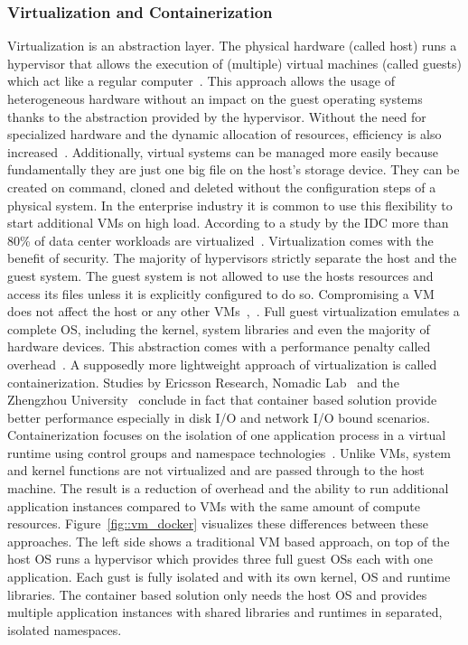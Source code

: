 \documentclass[12pt, a4paper]{article}
\begin{document}
        \subsubsection{Virtualization and Containerization}
        Virtualization is an abstraction layer. The physical hardware (called host) runs a hypervisor that allows the execution of (multiple) virtual machines (called guests) which act like a regular computer~\cite{vmbasics}. This approach allows the usage of heterogeneous hardware without an impact on the guest operating systems thanks to the abstraction provided by the hypervisor. Without the need for specialized hardware and the dynamic allocation of resources, efficiency is also increased~\cite{redhat_venv}. Additionally, virtual systems can be managed more easily because fundamentally they are just one big file on the host's storage device. They can be created on command, cloned and deleted without the configuration steps of a physical system. In the enterprise industry it is common to use this flexibility to start additional \ac{VM}s on high load. According to a study by the \ac{IDC} more than 80\% of data center workloads are virtualized~\cite{virtualaddoption}. Virtualization comes with the benefit of security. The majority of hypervisors strictly separate the host and the guest system. The guest system is not allowed to use the hosts resources and access its files unless it is explicitly configured to do so. Compromising a \ac{VM} does not affect the host or any other \ac{VM}s~\cite{vmbasics},~\cite{redhat_venv}.\newline
        Full guest virtualization emulates a complete \ac{OS}, including the kernel, system libraries and even the majority of hardware devices. This abstraction comes with a performance penalty called overhead~\cite{vmbasics}. A supposedly more lightweight approach of virtualization is called containerization. Studies by Ericsson Research, Nomadic Lab~\cite{ieee_perfomance} and the Zhengzhou University~\cite{zhengzhou_university} conclude in fact that container based solution provide better performance especially in disk \acs{I/O} and network \acs{I/O} bound scenarios. Containerization focuses on the isolation of one application process in a virtual runtime using control groups and namespace technologies~\cite{cgroups}. Unlike \ac{VM}s, system and kernel functions are not virtualized and are passed through to the host machine. The result is a reduction of overhead and the ability to run additional application instances compared to \ac{VM}s with the same amount of compute resources. Figure~\ref{fig::vm_docker} visualizes these differences between these approaches. The left side shows a traditional \ac{VM} based approach, on top of the host \ac{OS} runs a hypervisor which provides three full guest \acl{OS}s each with one application. Each gust is fully isolated and with its own kernel, \ac{OS} and runtime libraries. The container based solution only needs the host \ac{OS} and provides multiple application instances with shared libraries and runtimes in separated, isolated namespaces.\newline
\end{document}
